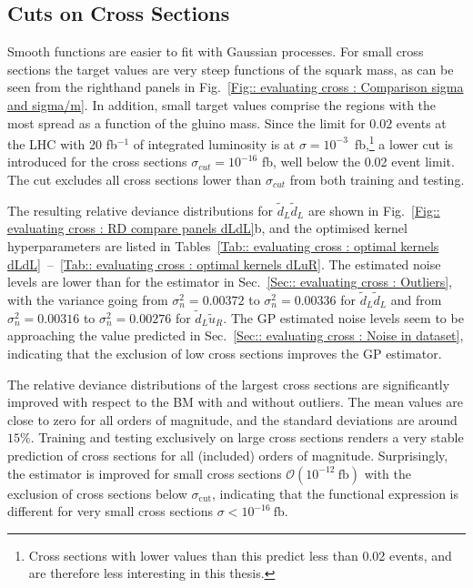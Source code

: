 \documentclass[twoside,english]{uiofysmaster}
\begin{document}
{{\subsection{Cuts on Cross Sections}

Smooth functions are easier to fit with Gaussian processes. For small cross sections the target values are very steep functions of the squark mass, as can be seen from the righthand panels in Fig.~\ref{Fig:: evaluating cross : Comparison sigma and sigma/m}. In addition, small target values comprise the regions with the most spread as a function of the gluino mass. Since the limit for $0.02$ events at the LHC with 20 fb$^{-1}$ of integrated luminosity is at $\sigma = 10^{-3}$~fb,\footnote{Cross sections with lower values than this predict less than 0.02 events, and are therefore less interesting in this thesis.} a lower cut is introduced for the cross sections $\sigma_{cut} = 10^{-16}$ fb, well below the 0.02 event limit. The cut excludes all cross sections lower than $\sigma_{cut}$ from both training and testing. 

The resulting relative deviance distributions for $\widetilde{d}_L \widetilde{d}_L$ are shown in Fig.~\ref{Fig:: evaluating cross : RD compare panels dLdL}b, and the optimised kernel hyperparameters are listed in Tables~\ref{Tab:: evaluating cross : optimal kernels dLdL}~--~\ref{Tab:: evaluating cross : optimal kernels dLuR}. The estimated noise levels are lower than for the estimator in Sec.~\ref{Sec:: evaluating cross : Outliers}, with the variance going from $\sigma_n^2=0.00372$ to $\sigma_n^2 = 0.00336$ for $\widetilde{d}_L \widetilde{d}_L$ and from $\sigma_n^2=0.00316$ to $\sigma_n^2=0.00276$ for $\widetilde{d}_L \widetilde{u}_R$. The GP estimated noise levels seem to be approaching the value predicted in Sec.~\ref{Sec:: evaluating cross : Noise in dataset}, indicating that the exclusion of low cross sections improves the GP estimator. 

The relative deviance distributions of the largest cross sections are significantly improved with respect to the BM with and without outliers. The mean values are close to zero for all orders of magnitude, and the standard deviations are around $15\%$. Training and testing exclusively on large cross sections renders a very stable prediction of cross sections for all (included) orders of magnitude. Surprisingly, the estimator is improved for small cross sections $\mathcal{O}(10^{-12}~\mathrm{fb})$ with the exclusion of cross sections below $\sigma_{\mathrm{cut}}$, indicating that the functional expression is different for very small cross sections $\sigma < 10^{-16}~\mathrm{fb}$.

}}
\end{document}
